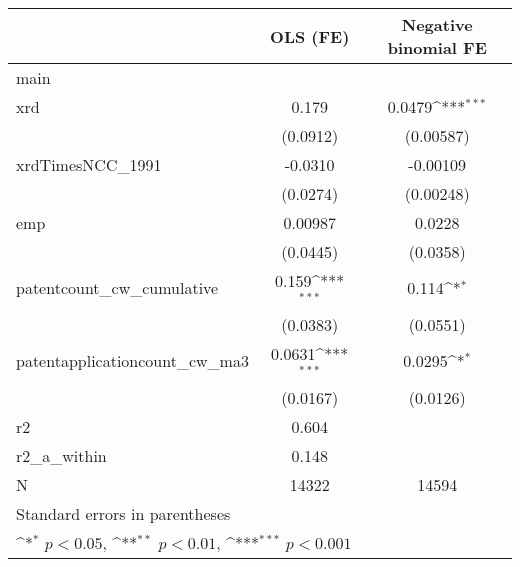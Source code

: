 {
\def\sym#1{\ifmmode^{#1}\else\(^{#1}\)\fi}
\begin{tabular}{l*{2}{c}}
\hline\hline
            &\multicolumn{1}{c}{OLS (FE)}&\multicolumn{1}{c}{Negative binomial FE}\\
\hline
main        &                     &                     \\
xrd         &       0.179         &      0.0479\sym{***}\\
            &    (0.0912)         &   (0.00587)         \\
[1em]
xrdTimesNCC\_1991&     -0.0310         &    -0.00109         \\
            &    (0.0274)         &   (0.00248)         \\
[1em]
emp         &     0.00987         &      0.0228         \\
            &    (0.0445)         &    (0.0358)         \\
[1em]
patentcount\_cw\_cumulative&       0.159\sym{***}&       0.114\sym{*}  \\
            &    (0.0383)         &    (0.0551)         \\
[1em]
patentapplicationcount\_cw\_ma3&      0.0631\sym{***}&      0.0295\sym{*}  \\
            &    (0.0167)         &    (0.0126)         \\
\hline
r2          &       0.604         &                     \\
r2\_a\_within &       0.148         &                     \\
N           &       14322         &       14594         \\
\hline\hline
\multicolumn{3}{l}{\footnotesize Standard errors in parentheses}\\
\multicolumn{3}{l}{\footnotesize \sym{*} \(p<0.05\), \sym{**} \(p<0.01\), \sym{***} \(p<0.001\)}\\
\end{tabular}
}
